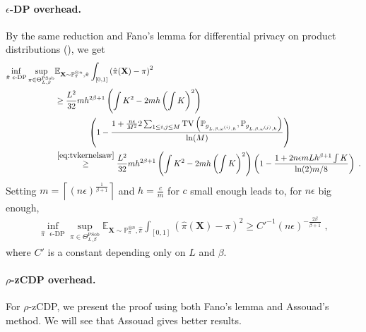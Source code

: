 \documentclass[10pt]{article} %
\newcommand{\Prob}[0]{\mathbb{P}}
\newcommand{\E}[0]{\mathbb{E}}
\newcommand\vect[1]{\mathbf{#1}}
\newcommand\tv[2]{\mathrm{TV}\left( {#1}, {#2} \right)}
\newcommand\p[1]{\left( {#1}\right)}
\newcommand\ceil[1]{\left\lceil {#1}\right\rceil}
\newcommand\RG[1]{\textcolor{red}{#1}}
\begin{document}
\paragraph{$\epsilon$-DP overhead.}

By the same reduction and Fano's lemma for differential privacy on product distributions (), we get
\begin{equation*}
    \begin{aligned}
    \inf_{\hat{\pi} \text{ $\epsilon$-DP}} \sup_{\pi \in \Theta^{\text{PSob}}_{L, \beta}}
    &\E_{\vect{X} \sim \Prob_{\pi}^{\otimes n}, \hat{\pi}} \int_{[0, 1]}\p{\hat{\pi}(\vect{X})- \pi}^2 \\
    &\geq 
     \frac{L^2}{32}  m h^{2 \beta + 1}  \p{ \int K^2 - 2m h \p{\int K}^2} \\
    &\quad\quad\quad\quad \p{1 - \frac{1 + \frac{n \epsilon}{M^2} 2 \sum_{1\leq i, j \leq M} \tv{\Prob_{g_{L, \beta, \omega^{(i)}, h}}}{\Prob_{g_{L, \beta, \omega^{(j)}, h}}}}{\ln (M)}} \\
    &\stackrel{\eqref{eq:tvkernelsaw}}{\geq }
    \frac{L^2}{32}  m h^{2 \beta + 1} \p{  \int K^2 - 2m h \p{\int K}^2}
    \p{1 - \frac{1 + 2 n \epsilon m L h^{\beta+1} \int K}{\ln(2) m/8}} \;.
    \end{aligned}
\end{equation*}
Setting $m = \ceil{\p{n \epsilon}^{\frac{1}{\beta + 1}}}$ and $h = \frac{c}{m}$ for $c$ small enough leads to, for $n\epsilon$ big enough, %
\begin{equation*}
    \begin{aligned}
    \inf_{\hat{\pi} \text{ $\epsilon$-DP}} \sup_{\pi \in \Theta^{\text{PSob}}_{L, \beta}}
    \E_{\vect{X} \sim \Prob_{\pi}^{\otimes n}, \hat{\pi}} \int_{[0, 1]}\p{\hat{\pi}(\vect{X})- \pi}^2 
    \geq 
     C'^{-1} \p{n \epsilon}^{-\frac{2 \beta}{\beta + 1}} \;,
    \end{aligned}
\end{equation*}
where $C'$ is a constant depending only on $L$ and $\beta$.

\paragraph{$\rho$-zCDP overhead.}For $\rho$-zCDP, we present the proof using both Fano's lemma and Assouad's method. We will see that Assouad gives better results.
\end{document}
